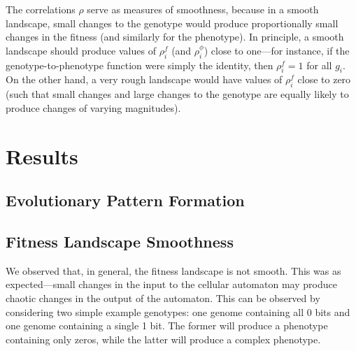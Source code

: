 \documentclass[twocolumn]{article}
\begin{document}
The correlations $\rho$ serve as measures of smoothness, because in a smooth landscape, small changes to the genotype would produce proportionally small changes in the fitness (and similarly for the phenotype). In principle, a smooth landscape should produce values of $\rho_i^f$ (and $\rho_i^\phi$) close to one---for instance, if the genotype-to-phenotype function were simply the identity, then $\rho_i^f = 1$ for all $g_i$. On the other hand, a very rough landscape would have values of $\rho_i^f$ close to zero (such that small changes and large changes to the genotype are equally likely to produce changes of varying magnitudes).

\section{Results}

\subsection{Evolutionary Pattern Formation}


\subsection{Fitness Landscape Smoothness}

We observed that, in general, the fitness landscape is not smooth. This was as expected---small changes in the input to the cellular automaton may produce chaotic changes in the output of the automaton. This can be observed by considering two simple example genotypes: one genome containing all 0 bits and one genome containing a single 1 bit. The former will produce a phenotype containing only zeros, while the latter will produce a complex phenotype.
\end{document}
